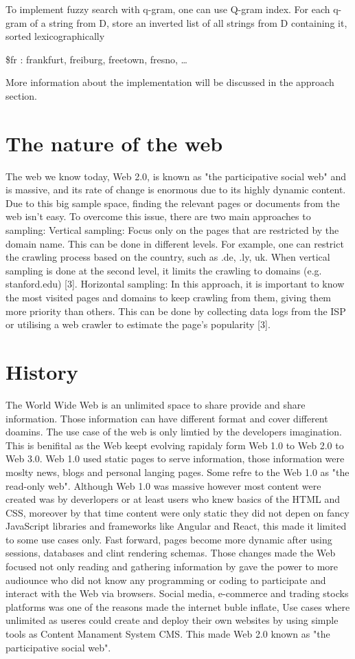 To implement fuzzy search with q-gram, one can use Q-gram index. For each q-gram of a string from D, store an inverted list of all strings from D containing it, sorted lexicographically

\$fr : frankfurt, freiburg, freetown, fresno, …

More information about the implementation will be discussed in the approach section.


\section{The nature of the web}
The web we know today, Web 2.0, is known as "the participative social web" and is massive, and its rate of change is enormous due to its highly dynamic content. Due to this big sample space, finding the relevant pages or documents from the web isn't easy. To overcome this issue, there are two main approaches to sampling: 
Vertical sampling: Focus only on the pages that are restricted by the domain name. This can be done in different levels. For example, one can restrict the crawling process based on the country, such as .de, .ly, uk. When vertical sampling is done at the second level, it limits the crawling to domains (e.g. stanford.edu) [3].
Horizontal sampling: In this approach, it is important to know the most visited pages and domains to keep crawling from them, giving them more priority than others. This can be done by collecting data logs from the ISP or utilising a web crawler to estimate the page's popularity [3]. 


\section{History}

The World Wide Web is an unlimited space to share provide and share information. Those information can have different format and cover different doamins. The use case of the web is only limtied by the developers imagination. This is benifital as the Web keept evolving rapidaly form Web 1.0 to Web 2.0 to Web 3.0. Web 1.0 used static pages to serve information, those information were moslty news, blogs and personal langing pages. Some refre to the Web 1.0 as "the read-only web". Although Web 1.0 was massive however most content were created was by deverlopers or at least users who knew basics of the HTML and CSS, moreover by that time content were only static they did not depen on fancy JavaScript libraries and frameworks like Angular and React, this made it limited to some use cases only. Fast forward, pages become more dynamic after using sessions, databases and clint rendering schemas. Those changes made the Web focused not only reading and gathering information by gave the power to more audiounce who did not know any programming or coding to participate and interact with the Web via browsers. Social media, e-commerce and trading stocks platforms was one of the reasons made the internet buble inflate, Use cases where unlimited as useres could create and deploy their own websites by using simple tools as Content Manament System CMS. This made Web 2.0 known as "the participative social web".

